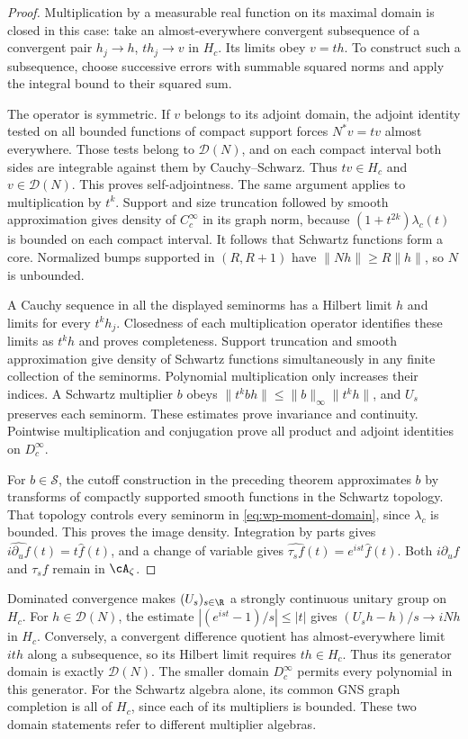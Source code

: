 \begin{proof}
Multiplication by a measurable real function on its maximal domain is
closed in this case: take an almost-everywhere convergent subsequence
of a convergent pair $h_j\to h$, $t h_j\to v$ in $H_c$.
Its limits obey $v=th$.
To construct such a subsequence, choose successive errors with summable
squared norms and apply the integral bound to their squared sum.

The operator is symmetric.
If $v$ belongs to its adjoint domain, the adjoint identity tested on all
bounded functions of compact support forces $N^*v=tv$ almost everywhere.
Those tests belong to $\mathcal D(N)$, and on each compact interval
both sides are integrable against them by Cauchy--Schwarz.
Thus $tv\in H_c$ and $v\in\mathcal D(N)$.
This proves self-adjointness.
The same argument applies to multiplication by $t^k$.
Support and size truncation followed by smooth approximation gives density
of $C_c^\infty$ in its graph norm, because
$(1+t^{2k})\lambda_c(t)$ is bounded on each compact interval.
It follows that Schwartz functions form a core.
Normalized bumps supported in $(R,R+1)$ have $\|Nh\|\geq R\|h\|$,
so $N$ is unbounded.

A Cauchy sequence in all the displayed seminorms has a Hilbert limit
$h$ and limits for every $t^k h_j$.
Closedness of each multiplication operator identifies these limits as
$t^k h$ and proves completeness.
Support truncation and smooth approximation give density of Schwartz
functions simultaneously in any finite collection of the seminorms.
Polynomial multiplication only increases their indices.
A Schwartz multiplier $b$ obeys
$\|t^k bh\|\leq\|b\|_\infty\|t^k h\|$, and $U_s$ preserves each seminorm.
These estimates prove invariance and continuity.
Pointwise multiplication and conjugation prove all product and adjoint
identities on $D_c^\infty$.

For $b\in\mathscr S$, the cutoff construction in the preceding theorem
approximates $b$ by transforms of compactly supported smooth functions
in the Schwartz topology.
That topology controls every seminorm in \eqref{eq:wp-moment-domain},
since $\lambda_c$ is bounded.
This proves the image density.
Integration by parts gives $\widehat{i\partial_u f}(t)=t\widehat f(t)$,
and a change of variable gives $\widehat{\tau_s f}(t)=e^{ist}\widehat f(t)$.
Both $i\partial_u f$ and $\tau_s f$ remain in $\cA_\zeta$.
\end{proof}

Dominated convergence makes $(U_s)_{s\in\R}$ a strongly continuous
unitary group on $H_c$.
For $h\in\mathcal D(N)$, the estimate
$|(e^{ist}-1)/s|\leq|t|$ gives
$(U_s h-h)/s\to iNh$ in $H_c$.
Conversely, a convergent difference quotient has almost-everywhere limit
$ith$ along a subsequence, so its Hilbert limit requires $th\in H_c$.
Thus its generator domain is exactly $\mathcal D(N)$.
The smaller domain $D_c^\infty$ permits every polynomial in this generator.
For the Schwartz algebra alone, its common GNS graph completion is all
of $H_c$, since each of its multipliers is bounded.
These two domain statements refer to different multiplier algebras.


